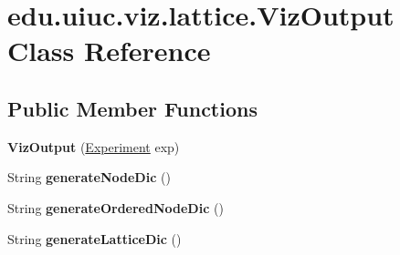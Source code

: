 \hypertarget{classedu_1_1uiuc_1_1viz_1_1lattice_1_1_viz_output}{}\section{edu.\+uiuc.\+viz.\+lattice.\+Viz\+Output Class Reference}
\label{classedu_1_1uiuc_1_1viz_1_1lattice_1_1_viz_output}
\subsection*{Public Member Functions}
\begin{DoxyCompactItemize}
\item 
\mbox{\label{classedu_1_1uiuc_1_1viz_1_1lattice_1_1_viz_output_a010fa2fe4ef4ce0e77a99056a79b7c4d}} 
{\bfseries Viz\+Output} (\mbox{\hyperlink{classedu_1_1uiuc_1_1viz_1_1algorithms_1_1_experiment}{Experiment}} exp)
\item 
\mbox{\label{classedu_1_1uiuc_1_1viz_1_1lattice_1_1_viz_output_a90b2abe7b944e3e412f515829e23a79a}} 
String {\bfseries generate\+Node\+Dic} ()
\item 
\mbox{\label{classedu_1_1uiuc_1_1viz_1_1lattice_1_1_viz_output_ad47008139c9bc6986968fa0d42c0d619}} 
String {\bfseries generate\+Ordered\+Node\+Dic} ()
\item 
\mbox{\label{classedu_1_1uiuc_1_1viz_1_1lattice_1_1_viz_output_a214a905a6ddbc689b9f2413b048e09fb}} 
String {\bfseries generate\+Lattice\+Dic} ()
\end{DoxyCompactItemize}
